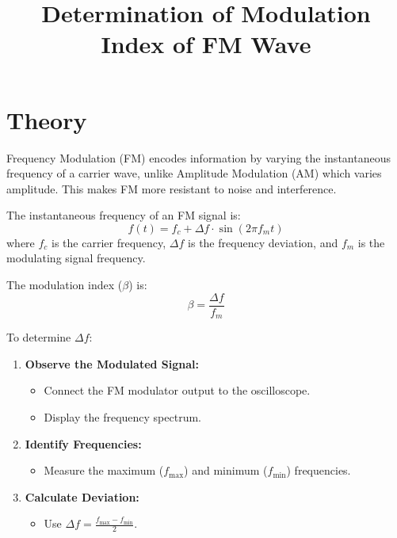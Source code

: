 \documentclass[12pt]{article}
\title{Determination of Modulation Index of FM Wave}
\author{}
\date{}
\begin{document}


\pagebreak

\tableofcontents

\pagebreak
{}
\maketitle

\section*{Theory}
Frequency Modulation (FM) encodes information by varying the instantaneous frequency of a carrier wave, unlike Amplitude Modulation (AM) which varies amplitude. This makes FM more resistant to noise and interference.

The instantaneous frequency of an FM signal is:
\[
    f(t) = f_c + \Delta f \cdot \sin(2 \pi f_m t)
\]
where \( f_c \) is the carrier frequency, \( \Delta f \) is the frequency deviation, and \( f_m \) is the modulating signal frequency.

The modulation index (\( \beta \)) is:
\[
    \beta = \frac{\Delta f}{f_m}
\]

To determine \( \Delta f \):
\begin{enumerate}
    \item \textbf{Observe the Modulated Signal:}
          \begin{itemize}
              \item Connect the FM modulator output to the oscilloscope.
              \item Display the frequency spectrum.
          \end{itemize}
    \item \textbf{Identify Frequencies:}
          \begin{itemize}
              \item Measure the maximum (\( f_{\text{max}} \)) and minimum (\( f_{\text{min}} \)) frequencies.
          \end{itemize}
    \item \textbf{Calculate Deviation:}
          \begin{itemize}
              \item Use \( \Delta f = \frac{f_{\text{max}} - f_{\text{min}}}{2} \).
          \end{itemize}
\end{enumerate}
\end{document}
